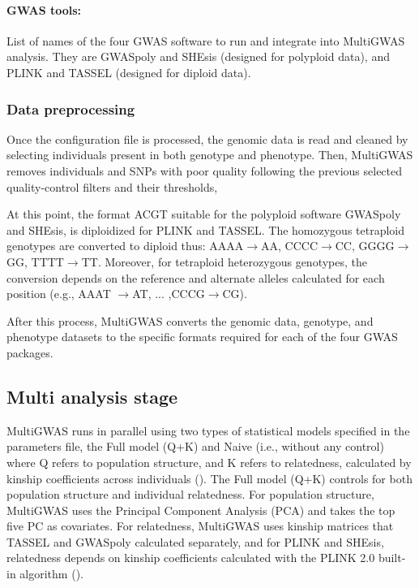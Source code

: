 \documentclass{article}
\renewcommand{\textrightarrow}{$\rightarrow$}
\begin{document}
\paragraph{{GWAS tools:}}
List of names of the four GWAS software to run and integrate into MultiGWAS analysis. They are GWASpoly and SHEsis (designed for polyploid data), and PLINK and TASSEL (designed for diploid data). 

\subsubsection{Data preprocessing}

Once the configuration file is processed, the genomic data is read and cleaned by selecting individuals present in both genotype and phenotype. Then, MultiGWAS removes individuals and SNPs with poor quality following the previous selected quality-control filters and their thresholds, 

At this point, the format \textquotedbl{}ACGT\textquotedbl{} suitable for the polyploid software GWASpoly and SHEsis, is \textquotedbl{}diploidized\textquotedbl{} for PLINK and TASSEL. The homozygous tetraploid genotypes are converted to diploid thus: AAAA\textrightarrow AA, CCCC\textrightarrow CC, GGGG\textrightarrow GG, TTTT\textrightarrow TT. Moreover, for tetraploid heterozygous genotypes, the conversion depends on the reference and alternate alleles calculated for each position (e.g., AAAT \textrightarrow AT, ... ,CCCG\textrightarrow CG). 

After this process, MultiGWAS converts the genomic data, genotype, and phenotype datasets to the specific formats required for each of the four GWAS packages.

\subsection{Multi analysis stage}
MultiGWAS runs in parallel using two types of statistical models specified in the parameters file, the Full model (Q+K) and Naive (i.e., without any control) where Q refers to population structure, and K refers to relatedness, calculated by kinship coefficients across individuals (\cite{Sharma2018}). The Full model (Q+K) controls for both population structure and individual relatedness. For population structure, MultiGWAS uses the Principal Component Analysis (PCA) and takes the top five PC as covariates. For relatedness, MultiGWAS uses kinship matrices that TASSEL and GWASpoly calculated separately, and for PLINK and SHEsis, relatedness depends on kinship coefficients calculated with the PLINK 2.0 built-in algorithm (\cite{Chang2015}). 
\end{document}
